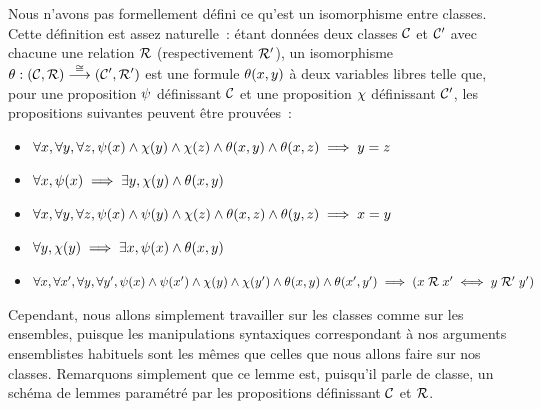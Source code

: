\begin{remark}
  Nous n'avons pas formellement défini ce qu'est un isomorphisme entre classes.
  Cette définition est assez naturelle~: étant données deux classes $\mathcal{C}$
  et $\mathcal{C}'$ avec chacune une relation $\mathrel{\mathcal{R}}$ (respectivement $\mathrel{\mathcal{R}}'$), un
  isomorphisme $\theta : \displaystyle (\mathcal{C},\mathrel{\mathcal{R}}) \overset{\cong}{\longrightarrow} (\mathcal{C}',\mathrel{\mathcal{R}}')$
  est une formule $\theta(x,y)$ à deux variables libres telle que, pour une
  proposition $\psi$ définissant $\mathcal{C}$ et une proposition $\chi$
  définissant $\mathcal{C}'$, les propositions suivantes peuvent être prouvées~:
  \begin{itemize}
  \item $\forall x,\forall y,\forall z, \psi(x)\land \chi(y)\land\chi(z)
    \land\theta(x,y)\land\theta(x,z) \implies y = z$
  \item $\forall x,\psi(x)\implies \exists y, \chi(y)\land\theta(x,y)$
  \item $\forall x,\forall y,\forall z, \psi(x)\land\psi(y)\land\chi(z)
    \land\theta(x,z)\land\theta(y,z)\implies x = y$
  \item $\forall y,\chi(y)\implies \exists x, \psi(x)\land\theta(x,y)$
  \item $\forall x,\forall x',\forall y, \forall y',
    \psi(x)\land\psi(x')\land
    \chi(y)\land\chi(y')\land\theta(x,y)\land\theta(x',y')\implies
    (x\mathrel{\mathcal{R}} x'\iff y\mathrel{\mathcal{R}}' y')$
  \end{itemize}

  Cependant, nous allons simplement travailler sur les classes comme sur les
  ensembles, puisque les manipulations syntaxiques correspondant à nos
  arguments ensemblistes habituels sont les mêmes que celles que nous allons
  faire sur nos classes. Remarquons simplement que ce lemme est, puisqu'il parle
  de classe, un schéma de lemmes paramétré par les propositions définissant
  $\mathcal{C}$ et $\mathrel{\mathcal{R}}$.
\end{remark}

